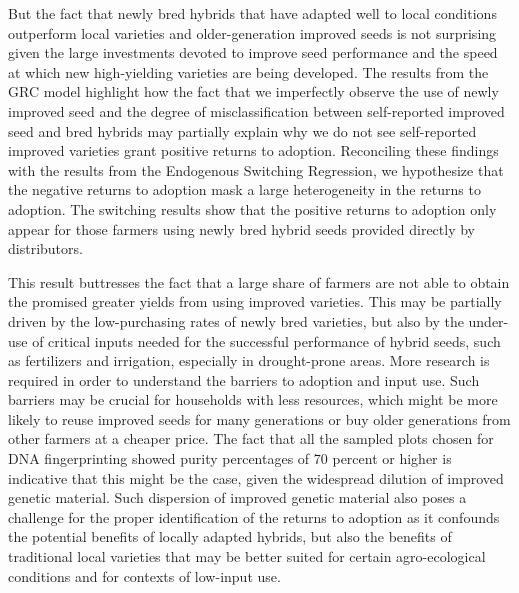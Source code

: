 \documentclass[11pt]{article}
\begin{document}
But the fact that newly bred hybrids that have adapted well to local conditions outperform local varieties and older-generation improved seeds is not surprising given the large investments devoted to improve seed performance and the speed at which new high-yielding varieties are being developed. The results from the GRC model highlight how the fact that we imperfectly observe the use of newly improved seed and the degree of misclassification between self-reported improved seed and bred hybrids may partially explain why we do not see self-reported improved varieties grant positive returns to adoption. Reconciling these findings with the results from the Endogenous Switching Regression, we hypothesize that the negative returns to adoption mask a large heterogeneity in the returns to adoption. The switching results show that the positive returns to adoption only appear for those farmers using newly bred hybrid seeds provided directly by distributors. 

This result buttresses the fact that a large share of farmers are not able to obtain the promised greater yields from using improved varieties. This may be partially driven by the low-purchasing rates of newly bred varieties, but also by the under-use of critical inputs needed for the successful performance of hybrid seeds, such as fertilizers and irrigation, especially in drought-prone areas. More research is required in order to understand the barriers to adoption and input use. Such barriers may be crucial for households with less resources, which might be more likely to reuse improved seeds for many generations or buy older generations from other farmers at a cheaper price. The fact that all the sampled plots chosen for DNA fingerprinting showed purity percentages of 70 percent or higher is indicative that this might be the case, given the widespread dilution of improved genetic material. Such dispersion of improved genetic material also poses a challenge for the proper identification of the returns to adoption as it confounds the potential benefits of locally adapted hybrids, but also the benefits of traditional local varieties that may be better suited for certain agro-ecological conditions and for contexts of low-input use.  
\end{document}
